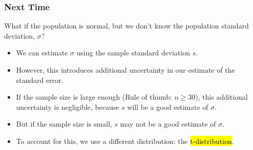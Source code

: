 \documentclass[slidestop,compress,mathserif]{beamer}
\begin{document}
\begin{frame}
\frametitle{Next Time}
What if the population is normal, but we don't know the population standard deviation, $\sigma$?

\begin{itemize}
    \item We can estimate $\sigma$ using the sample standard deviation $s$.
    \item However, this introduces additional uncertainty in our estimate of the standard error.
    \item If the sample size is large enough (Rule of thumb: $n \geq 30$), this additional uncertainty is negligible, because $s$ will be a good estimate of $\sigma$.
    \item But if the sample size is small, $s$ may not be a good estimate of $\sigma$.
    \item To account for this, we use a different distribution: the \hl{t-distribution}.
\end{itemize}

\end{frame}
\end{document}
